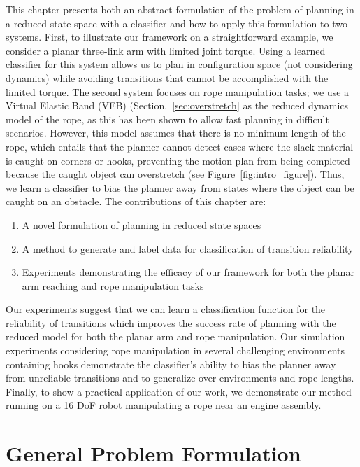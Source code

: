 This chapter presents both an abstract formulation of the problem of planning in a reduced state space with a classifier and how to apply this formulation to two systems. First, to illustrate our framework on a straightforward example, we consider a planar three-link arm with limited joint torque. Using a learned classifier for this system allows us to plan in configuration space (not considering dynamics) while avoiding transitions that cannot be accomplished with the limited torque. The second system focuses on rope manipulation tasks; we use a Virtual Elastic Band (VEB) (Section.~\ref{sec:overstretch} as the reduced dynamics model of the rope, as this has been shown to allow fast planning in difficult scenarios. However, this model assumes that there is no minimum length of the rope, which entails that the planner cannot detect cases where the slack material is caught on corners or hooks, preventing the motion plan from being completed because the caught object can overstretch (see Figure~\ref{fig:intro_figure}). Thus, we learn a classifier to bias the planner away from states where the object can be caught on an obstacle.
The contributions of this chapter are:
\begin{enumerate}
    \item A novel formulation of planning in reduced state spaces
    \item A method to generate and label data for classification of transition reliability
    \item Experiments demonstrating the efficacy of our framework for both the planar arm reaching and rope manipulation tasks
\end{enumerate}

Our experiments suggest that we can learn a classification function for the reliability of transitions which improves the success rate of planning with the reduced model for both the planar arm and rope manipulation. Our simulation experiments considering rope manipulation in several challenging environments containing hooks demonstrate the classifier's ability to bias the planner away from unreliable transitions and to generalize over environments and rope lengths. Finally, to show a practical application of our work, we demonstrate our method running on a 16 DoF robot manipulating a rope near an engine assembly.


\section{General Problem Formulation}

